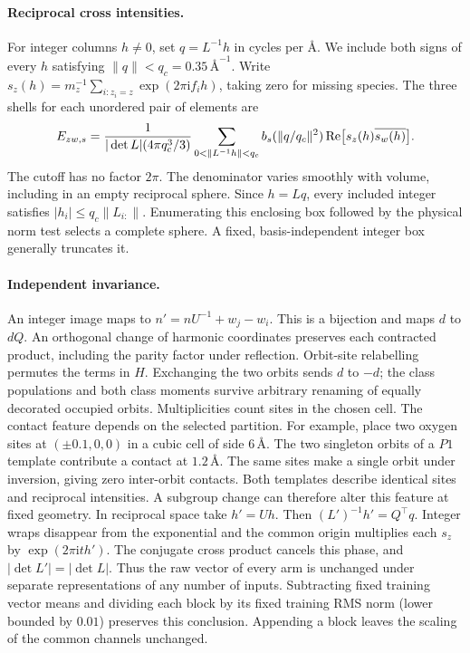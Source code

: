 \paragraph{Reciprocal cross intensities.}
For integer columns \(h\ne0\), set \(q=L^{-1}h\) in cycles per \(\text{\AA}\).
We include both signs of every \(h\) satisfying \(\|q\|<q_c=0.35\,\text{\AA}^{-1}\).
Write \(s_z(h)=m_z^{-1}\sum_{i:z_i=z}\exp(2\pi\mathrm{i}f_i h)\), taking zero for missing species.
The three shells for each unordered pair of elements are
\[
 E_{zw,s}=\frac{1}{|\det L|(4\pi q_c^3/3)}
 \sum_{0<\|L^{-1}h\|<q_c} b_s(\|q/q_c\|^2)\,
                    {\rm Re}\big[s_z(h)\overline{s_w(h)}\big].
\]
The cutoff has no factor \(2\pi\). The denominator varies smoothly with volume, including in an
empty reciprocal sphere. Since \(h=Lq\), every included integer satisfies
\(|h_i|\leq q_c\|L_{i:}\|\). Enumerating this enclosing box followed by the physical norm test
selects a complete sphere. A fixed, basis-independent integer box generally truncates it.

\paragraph{Independent invariance.}
An integer image maps to \(n'=nU^{-1}+w_j-w_i\). This is a bijection and maps \(d\) to \(dQ\).
An orthogonal change of harmonic coordinates preserves each contracted product, including the
parity factor under reflection. Orbit-site relabelling permutes the terms in \(H\). Exchanging
the two orbits sends \(d\) to \(-d\); the class populations and both class moments survive arbitrary
renaming of equally decorated occupied orbits. Multiplicities count sites in the chosen cell.
The contact feature depends on the selected partition. For example, place two oxygen sites at
\((\pm0.1,0,0)\) in a cubic cell of side \(6\,\text{\AA}\). The two singleton orbits of a
\(P1\) template contribute a contact at \(1.2\,\text{\AA}\). The same sites make a single
orbit under inversion, giving zero inter-orbit contacts. Both templates describe identical sites
and reciprocal intensities. A subgroup change can therefore alter this feature at fixed geometry.
In reciprocal space take \(h'=Uh\). Then \((L')^{-1}h'=Q^\top q\).
Integer wraps disappear from the exponential and the common origin multiplies each \(s_z\) by
\(\exp(2\pi\mathrm{i}t h')\). The conjugate cross product cancels this phase, and
\(|\det L'|=|\det L|\). Thus the raw vector of every arm is unchanged under separate
representations of any number of inputs. Subtracting fixed training vector means and dividing
each block by its fixed training RMS norm (lower bounded by \(0.01\)) preserves this conclusion.
Appending a block leaves the scaling of the common channels unchanged.

